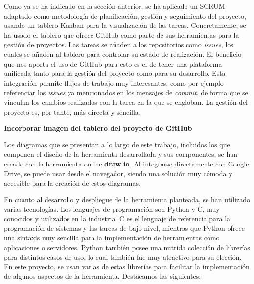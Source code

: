 Como ya se ha indicado en la sección anterior, se ha aplicado un SCRUM adaptado
como metodología de planificación, gestión y seguimiento del proyecto, usando un
tablero Kanban para la visualización de las tareas. Concretamente, se ha usado
el tablero que ofrece GitHub como parte de sus herramientas para la gestión de
proyectos. Las tareas se añaden a los repositorios como \textit{issues}, los
cuales se añaden al tablero para controlar su estado de realización. El
beneficio que nos aporta el uso de GitHub para esto es el de tener una
plataforma unificada tanto para la gestión del proyecto como para su desarrollo.
Esta integración permite flujos de trabajo muy interesantes, como por ejemplo
referenciar los \textit{issues} ya mencionados en los mensajes de
\textit{commit}, de forma que se vinculan los cambios realizados con la tarea en
la que se engloban. La gestión del proyecto es, por tanto, más directa y
sencilla.

\textbf{Incorporar imagen del tablero del proyecto de GitHub}

Los diagramas que se presentan a lo largo de este trabajo, incluidos los que
componen el diseño de la herramienta desarrollada y sus componentes, se han
creado con la herramienta online \textbf{draw.io}. Al integrarse directamente
con Google Drive, se puede usar desde el navegador, siendo una solución muy
cómoda y accesible para la creación de estos diagramas.

En cuanto al desarrollo y despliegue de la herramienta planteada, se han
utilizado varias tecnologías. Los lenguajes de programación son Python y C, muy
conocidos y utilizados en la industria. C es el lenguaje de referencia para la
programación de sistemas y las tareas de bajo nivel, mientras que Python ofrece
una sintaxis muy sencilla para la implementación de herramientas como
aplicaciones o servidores. Python también posee una nutrida colección de
librerías para distintos casos de uso, lo cual también fue muy atractivo para su
elección. En este proyecto, se usan varias de estas librerías para facilitar la
implementación de algunos aspectos de la herramienta. Destacamos las siguientes:

